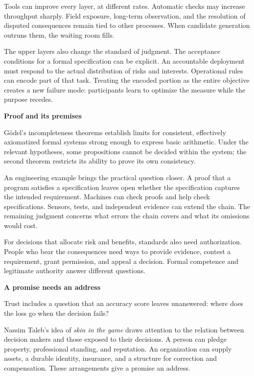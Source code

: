 \documentclass[11pt,openany]{book}
\newcommand{\subhead}[1]{\par\medskip\noindent\textbf{#1}\par\nobreak\smallskip}
\begin{document}
Tools can improve every layer, at different rates. Automatic checks may increase throughput sharply. Field exposure, long-term observation, and the resolution of disputed consequences remain tied to other processes. When candidate generation outruns them, the waiting room fills.

The upper layers also change the standard of judgment. The acceptance conditions for a formal specification can be explicit. An accountable deployment must respond to the actual distribution of risks and interests. Operational rules can encode part of that task. Treating the encoded portion as the entire objective creates a new failure mode: participants learn to optimize the measure while the purpose recedes.

\subhead{Proof and its premises}

Gödel's incompleteness theorems establish limits for consistent, effectively axiomatized formal systems strong enough to express basic arithmetic. Under the relevant hypotheses, some propositions cannot be decided within the system; the second theorem restricts its ability to prove its own consistency.\cite{godel1931}

An engineering example brings the practical question closer. A proof that a program satisfies a specification leaves open whether the specification captures the intended requirement. Machines can check proofs and help check specifications. Sensors, tests, and independent evidence can extend the chain. The remaining judgment concerns what errors the chain covers and what its omissions would cost.

For decisions that allocate risk and benefits, standards also need authorization. People who bear the consequences need ways to provide evidence, contest a requirement, grant permission, and appeal a decision. Formal competence and legitimate authority answer different questions.

\subhead{A promise needs an address}

Trust includes a question that an accuracy score leaves unanswered: where does the loss go when the decision fails?

Nassim Taleb's idea of \emph{skin in the game} draws attention to the relation between decision makers and those exposed to their decisions. A person can pledge property, professional standing, and reputation. An organization can supply assets, a durable identity, insurance, and a structure for correction and compensation. These arrangements give a promise an address.
\end{document}

